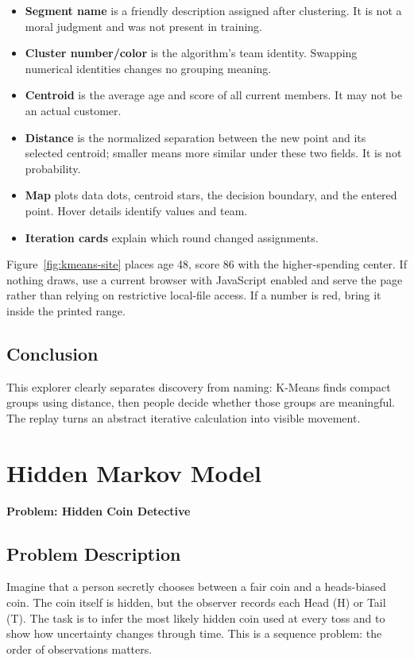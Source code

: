 \documentclass[12pt,a4paper,openany]{report}
\newcommand{\problemname}[1]{%
  \begin{center}
    {\Large\color{blue}\textbf{Problem: #1}}
  \end{center}
  \vspace{0.5em}
}
\begin{document}
\begin{itemize}
  \item \textbf{Segment name} is a friendly description assigned after
  clustering. It is not a moral judgment and was not present in training.
  \item \textbf{Cluster number/color} is the algorithm's team identity.
  Swapping numerical identities changes no grouping meaning.
  \item \textbf{Centroid} is the average age and score of all current members.
  It may not be an actual customer.
  \item \textbf{Distance} is the normalized separation between the new point
  and its selected centroid; smaller means more similar under these two fields.
  It is not probability.
  \item \textbf{Map} plots data dots, centroid stars, the decision boundary,
  and the entered point. Hover details identify values and team.
  \item \textbf{Iteration cards} explain which round changed assignments.
\end{itemize}
Figure~\ref{fig:kmeans-site} places age 48, score 86 with the higher-spending
center. If nothing draws, use a current browser with JavaScript enabled and
serve the page rather than relying on restrictive local-file access. If a
number is red, bring it inside the printed range.

\section{Conclusion}
This explorer clearly separates discovery from naming: K-Means finds compact
groups using distance, then people decide whether those groups are meaningful.
The replay turns an abstract iterative calculation into visible movement.

\fi
\ifdefined\AssignmentVersion
\chapter{Hidden Markov Model}
\problemname{Hidden Coin Detective}

\section{Problem Description}
Imagine that a person secretly chooses between a fair coin and a heads-biased
coin. The coin itself is hidden, but the observer records each Head (H) or Tail
(T). The task is to infer the most likely hidden coin used at every toss and to
show how uncertainty changes through time. This is a sequence problem: the
order of observations matters.
\end{document}
